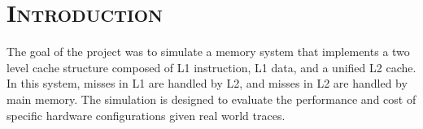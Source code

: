 \documentclass[FinalReport.tex]{subfiles}
\begin{document}
\bigskip

\section*{\textsc{\Large Introduction}}

The goal of the project was to simulate a memory system that implements a two level cache structure composed of L1 instruction, L1 data, and a unified L2 cache.  In this system, misses in L1 are handled by L2, and misses in L2 are handled by main memory. The simulation is designed to evaluate the performance and cost of specific hardware configurations given real world traces.  
\end{document}
